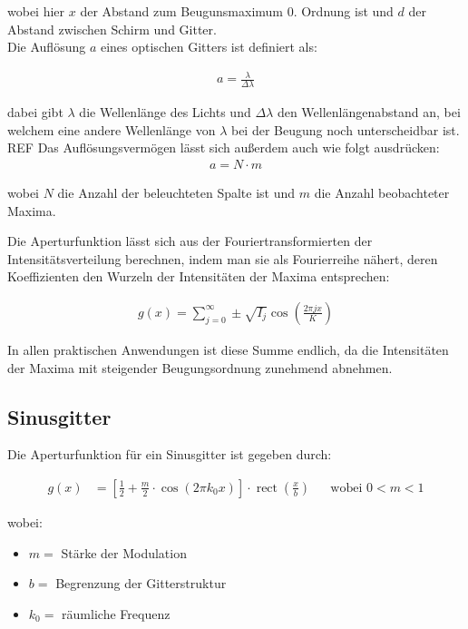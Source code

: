 \documentclass[12pt]{article}
\DeclareMathOperator{\rect}{\mathrm{rect}}
\begin{document}
wobei hier $x$ der Abstand zum Beugunsmaximum 0. Ordnung ist und $d$ der Abstand zwischen Schirm und Gitter.\\

Die Auflösung $a$ eines optischen Gitters ist definiert als:  \label{aufloesung}

\begin{align}
a = \frac{\lambda}{\Delta \lambda}
\end{align}

dabei gibt $\lambda$ die Wellenlänge des Lichts und $\Delta \lambda$ den Wellenlängenabstand an, bei welchem eine andere Wellenlänge von $\lambda$ bei der Beugung noch unterscheidbar ist. REF
Das Auflösungsvermögen lässt sich außerdem auch wie folgt ausdrücken:
\begin{align}
a = N \cdot m 
\end{align}

wobei $N$ die Anzahl der beleuchteten Spalte ist und $m$ die Anzahl beobachteter Maxima.

Die Aperturfunktion lässt sich aus der Fouriertransformierten der Intensitätsverteilung berechnen, indem man sie als Fourierreihe nähert, deren Koeffizienten den Wurzeln der Intensitäten der Maxima entsprechen:

\begin{align}
g(x) = \sum_{j = 0}^{\infty} \pm \sqrt{I_j}\cos\left( \frac{2 \pi j x}{K}\right) \label{Fourier1}
\end{align} 

In allen praktischen Anwendungen ist diese Summe endlich, da die Intensitäten der Maxima mit steigender Beugungsordnung zunehmend abnehmen. 

\subsection{Sinusgitter}

Die Aperturfunktion für ein Sinusgitter ist gegeben durch:

\begin{align}
g\left( x\right) &= \left[ \frac{1}{2} + \frac{m}{2} \cdot \cos\left( 2 \pi k_0 x \right)   \right] \cdot \rect \left( \frac{x}{b} \right)  &&\text{wobei } 0 < m < 1
\end{align}

wobei: 

\begin{itemize}
\item $m =$ Stärke der Modulation
\item $b =$ Begrenzung der Gitterstruktur
\item $k_0 = $ räumliche Frequenz
\end{itemize}
\end{document}
